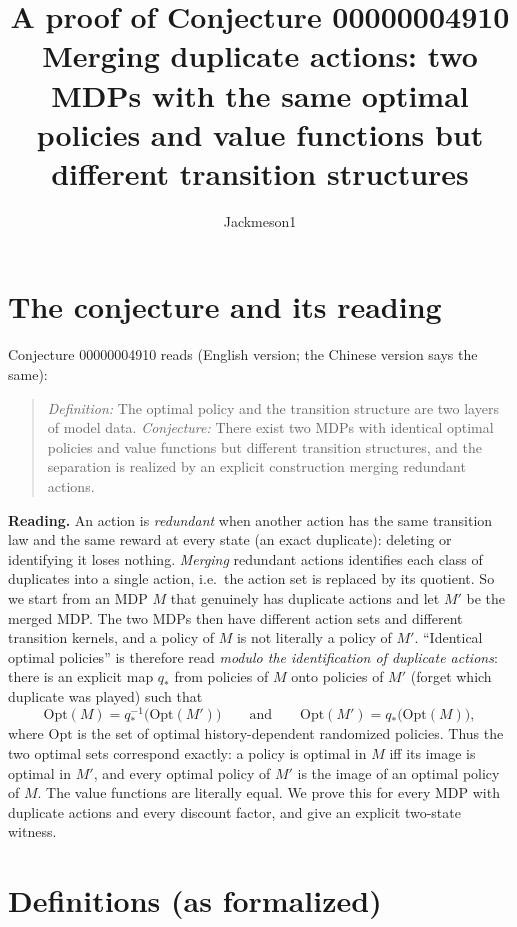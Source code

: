 \documentclass[11pt]{article}
\title{A proof of Conjecture 00000004910\\[2pt]
\large Merging duplicate actions: two MDPs with the same optimal policies and value functions
but different transition structures}
\author{Jackmeson1}
\date{}
\theoremstyle{definition}
\theoremstyle{remark}
\renewcommand{\_}{\oldus\allowbreak}
\begin{document}
\sloppy
\maketitle

\section{The conjecture and its reading}

Conjecture 00000004910 reads (English version; the Chinese version says the same):

\begin{quote}
\emph{Definition:} The optimal policy and the transition structure are two layers of model data.
\emph{Conjecture:} There exist two MDPs with identical optimal policies and value functions but
different transition structures, and the separation is realized by an explicit construction
merging redundant actions.
\end{quote}

\textbf{Reading.} An action is \emph{redundant} when another action has the same transition law
and the same reward at every state (an exact duplicate): deleting or identifying it loses nothing.
\emph{Merging} redundant actions identifies each class of duplicates into a single action, i.e.\
the action set is replaced by its quotient. So we start from an MDP $M$ that genuinely has
duplicate actions and let $M'$ be the merged MDP. The two MDPs then have different action sets
and different transition kernels, and a policy of $M$ is not literally a policy of $M'$.
``Identical optimal policies'' is therefore read \emph{modulo the identification of duplicate
actions}: there is an explicit map $q_*$ from policies of $M$ onto policies of $M'$ (forget which
duplicate was played) such that
\[
  \mathrm{Opt}(M)=q_*^{-1}\bigl(\mathrm{Opt}(M')\bigr)\qquad\text{and}\qquad
  \mathrm{Opt}(M')=q_*\bigl(\mathrm{Opt}(M)\bigr),
\]
where $\mathrm{Opt}$ is the set of optimal history-dependent randomized policies. Thus the two
optimal sets correspond exactly: a policy is optimal in $M$ iff its image is optimal in $M'$, and
every optimal policy of $M'$ is the image of an optimal policy of $M$. The value functions are
literally equal. We prove this for every MDP with duplicate actions and every discount factor,
and give an explicit two-state witness.

\section{Definitions (as formalized)}
\end{document}
